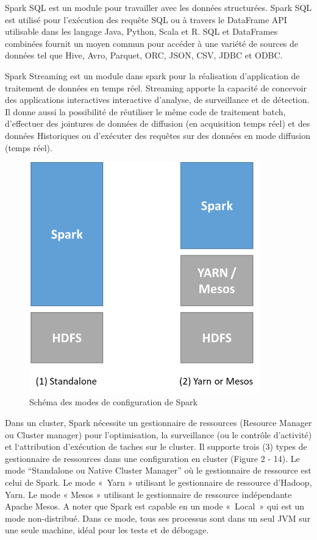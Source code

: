 \documentclass[12pt,english]{book}
\begin{document}
Spark SQL est un module pour travailler avec les données structurées.
Spark SQL est utilisé pour l’exécution des requête SQL ou à travers le DataFrame API utilisable dans les langage Java, Python, Scala et R.
SQL et DataFrames combinées fournit un moyen commun pour accéder à une variété de sources de données tel que Hive, Avro, Parquet, ORC, JSON, CSV, JDBC et ODBC.

Spark Streaming est un module dans spark pour la réalisation d’application de traitement de données en temps réel.
Streaming apporte la capacité de concevoir des applications interactives interactive d’analyse, de surveillance et de détection.
Il donne aussi la possibilité de réutiliser le même code de traitement batch, d’effectuer des jointures de données de diffusion (en acquisition temps réel) et des données Historiques ou d’exécuter des requêtes sur des données en mode diffusion (temps réel).

\begin{figure}[h]
	\centering
	\includegraphics[width=10cm]{sparkConfig}
	\caption{Schéma des modes de configuration de Spark}
\end{figure}

Dans un cluster, Spark nécessite un gestionnaire de ressources (Resource Manager ou Cluster manager) pour l’optimisation, la surveillance (ou le contrôle d’activité) et l‘attribution d’exécution de taches sur le cluster.
Il supporte trois (3) types de gestionnaire de ressources dans une configuration en cluster (Figure 2 - 14).
Le mode “Standalone ou Native Cluster Manager” où le gestionnaire de ressource est celui de Spark.
Le mode « Yarn » utilisant le gestionnaire de ressource d’Hadoop, Yarn.
Le mode « Mesos » utilisant le gestionnaire de ressource indépendante Apache Mesos.
A noter que Spark est capable en un mode « Local » qui est un mode non-distribué.
Dans ce mode, tous ses processus sont dans un seul JVM sur une seule machine, idéal pour les tests et de débogage.
\end{document}
